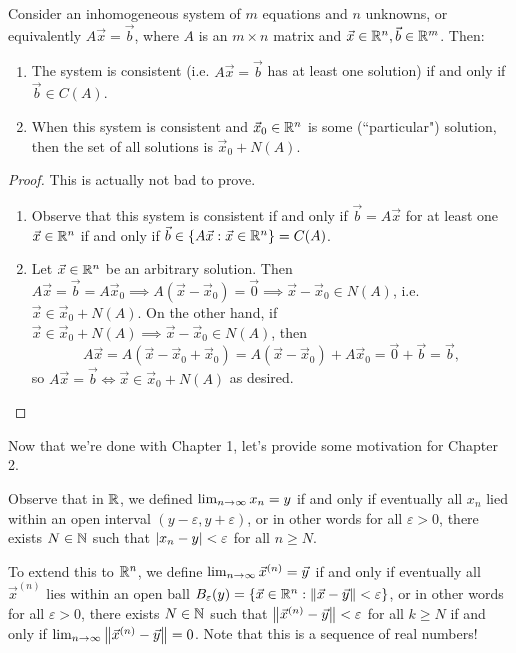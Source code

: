 \documentclass[main.tex]{subfiles}
\begin{document}
\begin{lemma}
    Consider an inhomogeneous system of $m$ equations and $n$ unknowns, or equivalently $A\vec{x} = \vec{b}$, where $A$ is an $m\times n$ matrix and $\vec{x}\in \mathbb R^n, \vec{b}\in \mathbb R^m$. Then:
    \begin{enumerate}
        \item The system is consistent (i.e. $A\vec{x} = \vec{b}$ has at least one solution) if and only if $\vec{b}\in C(A)$.
        \item When this system is consistent and $\vec{x}_0\in \mathbb R^n$ is some (``particular") solution, then the set of all solutions is $\vec{x}_0 + N(A)$.
    \end{enumerate}
\end{lemma}
\begin{proof}
    This is actually not bad to prove.
    \begin{enumerate}
        \item Observe that this system is consistent if and only if $\vec{b} = A\vec{x}$ for at least one $\vec{x}\in \mathbb R^n$ if and only if $\vec{b} \in \{A\vec{x} : \vec{x}\in \mathbb R^n\} = C(A)$.
        \item Let $\vec{x}\in \mathbb R^n$ be an arbitrary solution. Then $A\vec{x} = \vec{b} = A\vec{x}_0 \implies A(\vec{x} - \vec{x}_0) = \vec{0}\implies \vec{x} - \vec{x}_0 \in N(A)$, i.e. $\vec{x}\in \vec{x}_0 + N(A)$. On the other hand, if $\vec{x}\in \vec{x}_0 + N(A)\implies \vec{x} - \vec{x}_0 \in N(A)$, then 
        \[A\vec{x} = A(\vec{x} - \vec{x}_0 + \vec{x}_0) = A(\vec{x} - \vec{x}_0) + A\vec{x}_0 = \vec{0} + \vec{b} = \vec{b},\]
        so $A\vec{x} = \vec{b}\iff \vec{x}\in \vec{x}_0 + N(A)$ as desired.\qedhere
    \end{enumerate}
\end{proof}

Now that we're done with Chapter 1, let's provide some motivation for Chapter 2.

Observe that in $\mathbb R$, we defined $\lim_{n\to \infty} x_n = y$ if and only if eventually all $x_n$ lied within an open interval $(y - \varepsilon, y + \varepsilon)$, or in other words for all $\varepsilon > 0$, there exists $N\in \mathbb N$ such that $\left\lvert x_n - y \right\rvert < \varepsilon$ for all $n\ge N$.

To extend this to $\mathbb R^n$, we define $\lim_{n\to \infty} \vec{x}^{(n)} = \vec{y}$ if and only if eventually all $\vec{x}^{(n)}$ lies within an open ball $B_\varepsilon (y) = \{\vec{x} \in \mathbb R^n : \left\lVert \vec{x} - \vec{y} \right\rVert < \varepsilon\}$, or in other words for all $\varepsilon > 0$, there exists $N\in \mathbb N$ such that $\left\lVert \vec{x}^{(n)} - \vec{y} \right\rVert < \varepsilon$ for all $k\ge N$ if and only if $\lim_{n\to \infty} \left\lVert \vec{x}^{(n)} - \vec{y} \right\rVert = 0$. Note that this is a sequence of real numbers!
\end{document}
